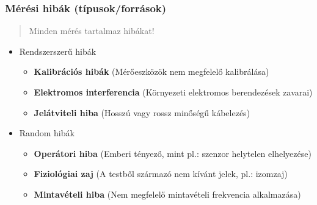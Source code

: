 \subsubsection{Mérési hibák (típusok/források)}
\begin{quote}
    Minden mérés tartalmaz hibákat!
\end{quote}
\begin{itemize}
    \item Rendszerszerű hibák
    \begin{itemize}
        \item \textbf{Kalibrációs hibák} (Mérőeszközök nem megfelelő kalibrálása)
        \item \textbf{Elektromos interferencia} (Környezeti elektromos berendezések zavarai)
        \item \textbf{Jelátviteli hiba} (Hosszú vagy rossz minőségű kábelezés)
    \end{itemize}
    \item Random hibák
    \begin{itemize}
        \item \textbf{Operátori hiba} (Emberi tényező, mint pl.: szenzor helytelen elhelyezése)
        \item \textbf{Fiziológiai zaj} (A testből származó nem kívánt jelek, pl.: izomzaj)
        \item \textbf{Mintavételi hiba} (Nem megfelelő mintavételi frekvencia alkalmazása)
    \end{itemize}
\end{itemize}

\clearpage
